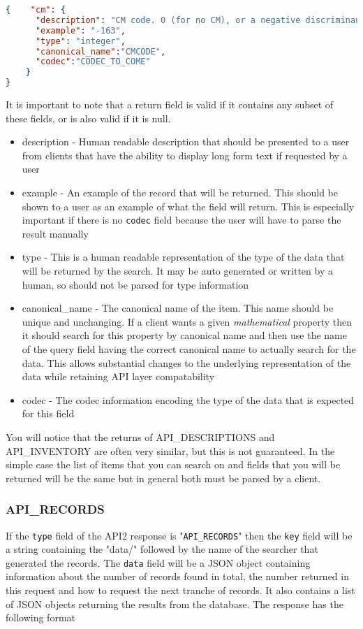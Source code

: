 \documentclass[11pt]{article}
\begin{document}
\begin{lstlisting}[language=json,firstnumber=1]
{    "cm": {
      "description": "CM code. 0 (for no CM), or a negative discriminant", 
      "example": "-163", 
      "type": "integer",
      "canonical_name":"CMCODE",
      "codec":"CODEC_TO_COME"
    }
}
\end{lstlisting}
It is important to note that a return field is valid if it contains any subset of these fields, or is also valid if it is null.
\begin{itemize}
\item description - Human readable description that should be presented to a user from clients that have the ability to display long form text if requested by a user
\item example - An example of the record that will be returned. This should be shown to a user as an example of what the field will return. This is especially important if there is no \texttt{codec} field because the user will have to parse the result manually
\item type - This is a human readable representation of the type of the data that will be returned by the search. It may be auto generated or written by a human, so should not be parsed for type information
\item canonical\_name - The canonical name of the item. This name should be unique and unchanging. If a client wants a given {\it mathematical} property then it should search for this property by canonical name and then use the name of the query field having the correct canonical name to actually search for the data. This allows substantial changes to the underlying representation of the data while retaining API layer compatability
\item codec - The codec information encoding the type of the data that is expected for this field
\end{itemize}

You will notice that the returns of API\_DESCRIPTIONS and API\_INVENTORY are often very similar, but this is not guaranteed. In the simple case the list of items that you can search on and fields that you will be returned will be the same but in general both must be parsed by a client.

\subsubsection{API\_RECORDS}
If the \texttt{type} field of the API2 response is "\texttt{API\_RECORDS}" then the \texttt{key} field will be a string containing the "data/" followed by the name of the searcher that generated the records. The \texttt{data} field will be a JSON object containing information about the number of records found in total, the number returned in this request and how to request the next tranche of records. It also contains a list of JSON objects returning the results from the database. The response has the following format
\end{document}
